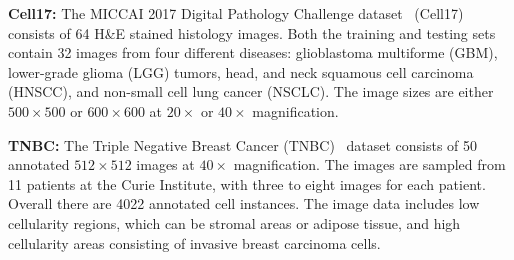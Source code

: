 \documentclass[letterpaper]{article} %
\begin{document}
\noindent \textbf{Cell17:}  
The MICCAI 2017 Digital Pathology Challenge dataset~\cite{vu2019methods} (Cell17)  consists of 64 H\&E stained histology images. Both the training and testing sets contain 32 images from four different diseases: glioblastoma multiforme (GBM), lower-grade glioma (LGG) tumors, head, and neck squamous cell carcinoma (HNSCC), and non-small cell lung cancer (NSCLC). The image sizes are either $500 \times 500$ or $600 \times 600$ at $20\times$ or $40\times$ magnification.

\noindent \textbf{TNBC:}  
The Triple Negative Breast Cancer (TNBC)~\cite{naylor2018segmentation} dataset consists of 50 annotated $512 \times 512$ images at $40\times$ magnification. The images are sampled from 11 patients at the Curie Institute, with three to eight images for each patient. Overall there are  4022 annotated cell instances. The image data includes low cellularity regions, which can be stromal areas or adipose tissue, and high cellularity areas consisting of invasive breast carcinoma cells.
\end{document}
